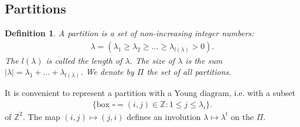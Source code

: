 \documentclass[12pt]{article}
\newtheorem{defn}{Definition}[section]
\numberwithin{equation}{section}
\theoremstyle{definition}
\begin{document}
\subsection{Partitions}
\begin{defn}\normalfont
    A \textit{partition} is a set of non-increasing integer numbers:
\begin{align*}
    \lambda = (\lambda_1 \geq \lambda_2 \ge  ... \ge \lambda_{l(\lambda)} > 0).
\end{align*}
The $l(\lambda)$ is called the length of $\lambda$. The size of $\lambda$ is the sum $|\lambda| = \lambda_1 + ... + \lambda_{l(\lambda)}$. We denote by $\Pi$ the set of all partitions.
\end{defn}
It is convenient to represent a partition with a Young diagram, i.e. with a subset
\begin{align*}
    \{ \text{box } \square = (i, j) \in \mathbb{Z} : 1 \leq j \leq \lambda_i \}.
\end{align*}
of $\mathbb{Z}^{2}$. The map $(i, j) \mapsto (j, i)$ defines an involution $\lambda \mapsto \lambda^{t}$ on the $\Pi$. 
\end{document}
